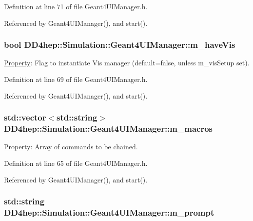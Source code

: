 Definition at line 71 of file Geant4UIManager.h.

Referenced by Geant4UIManager(), and start().\hypertarget{class_d_d4hep_1_1_simulation_1_1_geant4_u_i_manager_ae9d4d2c249167b2fb82ccec43d40000f}{
\subsubsection[{m\_\-haveVis}]{\setlength{\rightskip}{0pt plus 5cm}bool {\bf DD4hep::Simulation::Geant4UIManager::m\_\-haveVis}}}
\label{class_d_d4hep_1_1_simulation_1_1_geant4_u_i_manager_ae9d4d2c249167b2fb82ccec43d40000f}


\hyperlink{class_d_d4hep_1_1_property}{Property}: Flag to instantiate Vis manager (default=false, unless m\_\-visSetup set). 

Definition at line 69 of file Geant4UIManager.h.

Referenced by Geant4UIManager(), and start().\hypertarget{class_d_d4hep_1_1_simulation_1_1_geant4_u_i_manager_a37b623b5b76a886a17a0ce68ce484188}{
\subsubsection[{m\_\-macros}]{\setlength{\rightskip}{0pt plus 5cm}std::vector$<$std::string$>$ {\bf DD4hep::Simulation::Geant4UIManager::m\_\-macros}}}
\label{class_d_d4hep_1_1_simulation_1_1_geant4_u_i_manager_a37b623b5b76a886a17a0ce68ce484188}


\hyperlink{class_d_d4hep_1_1_property}{Property}: Array of commands to be chained. 

Definition at line 65 of file Geant4UIManager.h.

Referenced by Geant4UIManager(), and start().\hypertarget{class_d_d4hep_1_1_simulation_1_1_geant4_u_i_manager_a64fbd1b49cb4e68cb8af888c946c1f1d}{
\subsubsection[{m\_\-prompt}]{\setlength{\rightskip}{0pt plus 5cm}std::string {\bf DD4hep::Simulation::Geant4UIManager::m\_\-prompt}}}
\label{class_d_d4hep_1_1_simulation_1_1_geant4_u_i_manager_a64fbd1b49cb4e68cb8af888c946c1f1d}


